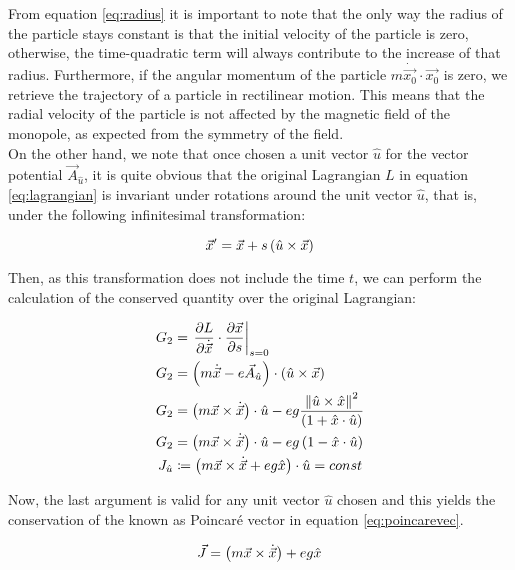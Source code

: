 From equation \eqref{eq:radius} it is important to note that the only way the radius of the particle stays constant is that the initial velocity of the particle is zero, otherwise, the time-quadratic term will always contribute to the increase of that radius. Furthermore, if the angular momentum of the particle $m\dot{\vec{x_0}}\cdot\vec{x_0}$ is zero, we retrieve the trajectory of a particle in rectilinear motion. This means that the radial velocity of the particle is not affected by the magnetic field of the monopole, as expected from the symmetry of the field.\\

On the other hand, we note that once chosen a unit vector $\hat{u}$ for the vector potential  $\vec{A}_{\hat{u}}$, it is quite obvious that the original Lagrangian $L$ in equation \eqref{eq:lagrangian} is invariant under rotations around the unit vector $\hat{u}$, that is, under the following infinitesimal transformation:

\begin{equation}
\vec{x}' = \vec{x} + s\left( \hat{u}\times\vec{x} \right)
\label{eq:rotinv}
\end{equation}

Then, as this transformation does not include the time $t$, we can perform the calculation of the conserved quantity over the original Lagrangian:

\begin{align*}
G_2 &= \left. \frac{\partial L}{\partial \dot{\vec{x}}}\cdot\frac{\partial \vec{x}}{\partial s} \right|_{s=0}\\
G_2 &= \left( m\dot{\vec{x}} - e\vec{A}_{\hat{u}} \right)\cdot \left( \hat{u}\times\vec{x} \right) \\
G_2 &= \left( m\vec{x}\times\dot{\vec{x}} \right)\cdot\hat{u}-eg\frac{\left\lVert \hat{u}\times\hat{x} \right\rVert^2}{\left( 1+\hat{x}\cdot\hat{u} \right)}\\
G_2 &= \left( m\vec{x}\times\dot{\vec{x}} \right)\cdot\hat{u} -eg\left( 1-\hat{x}\cdot\hat{u} \right)\\
J_{\hat{u}} &\coloneqq \left( {m\vec{x}\times\dot{\vec{x}}}+ eg\hat{x} \right)\cdot\hat{u} = const
\end{align*}

Now, the last argument is valid for any unit vector $\hat{u}$ chosen and this yields the conservation of the  known as Poincar\'e vector in equation \eqref{eq:poincarevec}.

\begin{equation}
\vec{J} = \left( m\vec{x}\times\dot{\vec{x}} \right)+ eg\hat{x}
\label{eq:poincarevec}
\end{equation}

